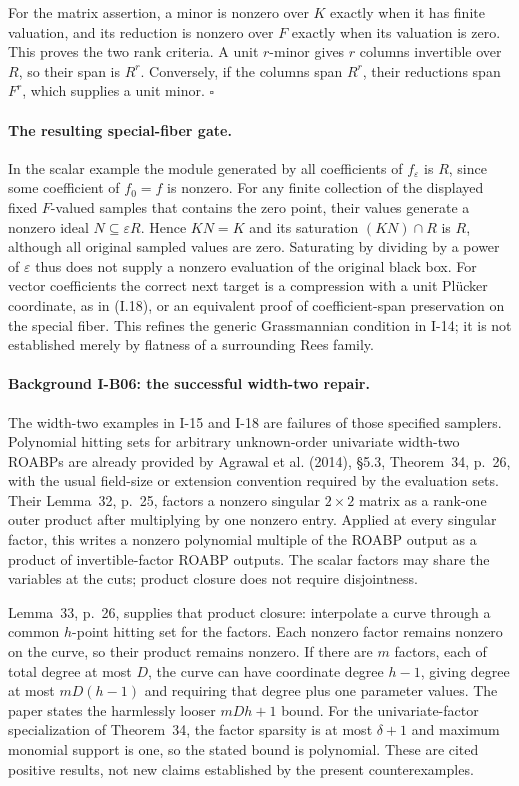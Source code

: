 For the matrix assertion, a minor is nonzero over $K$ exactly when
it has finite valuation, and its reduction is nonzero over $F$
exactly when its valuation is zero.  This proves the two rank
criteria.  A unit $r$-minor gives $r$ columns invertible over $R$,
so their span is $R^r$.  Conversely, if the columns span $R^r$,
their reductions span $F^r$, which supplies a unit minor.
\hfill$\square$

\paragraph{The resulting special-fiber gate.}
In the scalar example the module generated by all coefficients of
$f_\varepsilon$ is $R$, since some coefficient of $f_0=f$ is nonzero.
For any finite collection of the displayed fixed $F$-valued samples
that contains the zero point, their values generate a nonzero ideal $N\subseteq
\varepsilon R$.  Hence $K N=K$ and its saturation
$(KN)\cap R$ is $R$, although all original sampled values are zero.
Saturating by dividing by a power of $\varepsilon$ thus does not
supply a nonzero evaluation of the original black box.
For vector coefficients the correct next target is a compression
with a unit Pl\"ucker coordinate, as in (I.18), or an equivalent
proof of coefficient-span preservation on the special fiber.
This refines the generic Grassmannian condition in I-14; it is not
established merely by flatness of a surrounding Rees family.

\paragraph{Background I-B06: the successful width-two repair.}
The width-two examples in I-15 and I-18 are failures of those
specified samplers.  Polynomial hitting sets for arbitrary
unknown-order univariate width-two ROABPs are already provided by
Agrawal et al. (2014), \S5.3, Theorem~34, p.~26, with the usual
field-size or extension convention required by the evaluation sets.
Their Lemma~32, p.~25, factors a nonzero singular $2\times2$ matrix
as a rank-one outer product after multiplying by one nonzero entry.
Applied at every singular factor, this writes a nonzero polynomial
multiple of the ROABP output as a product of invertible-factor
ROABP outputs.  The scalar factors may share the variables at the
cuts; product closure does not require disjointness.

Lemma~33, p.~26, supplies that product closure: interpolate a curve
through a common $h$-point hitting set for the factors.  Each nonzero
factor remains nonzero on the curve, so their product remains
nonzero.  If there are $m$ factors, each of total degree at most $D$,
the curve can have coordinate degree $h-1$, giving degree at most
$mD(h-1)$ and requiring that degree plus one parameter values.
The paper states the harmlessly looser $mDh+1$ bound.  For the
univariate-factor specialization of Theorem~34, the factor sparsity
is at most $\delta+1$ and maximum monomial support is one, so the
stated bound is polynomial.  These are cited positive results,
not new claims established by the present counterexamples.

